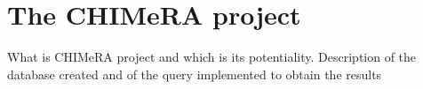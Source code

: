 \documentclass{standalone}
\begin{document}
\section[CHIMeRA]{The CHIMeRA project}\label{chimera}

What is CHIMeRA project and which is its potentiality.
Description of the database created and of the query implemented to obtain the results %
\end{document}
